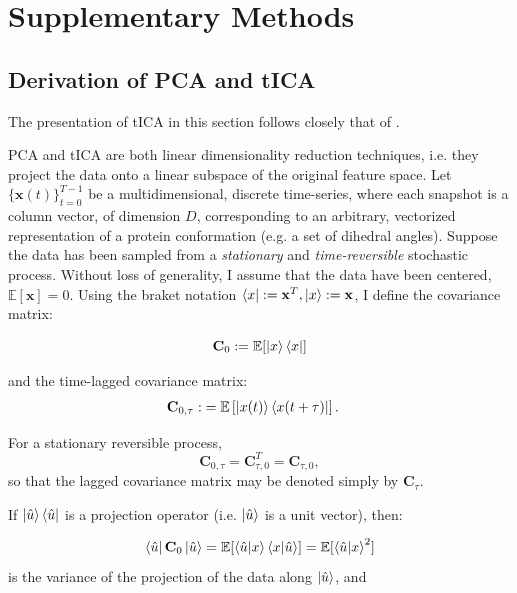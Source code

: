 \clearpage
\twocolumngrid
\section{Supplementary Methods}
\small
\renewcommand{\thesubsection}{S\arabic{subsection}}
\setcounter{subsection}{0}

\subsection{Derivation of PCA and tICA}
\label{supsec:derivation_PCA_TICA}

The presentation of tICA in this section follows closely that of \cite{my_tica_ref}.


PCA and tICA are both linear dimensionality reduction techniques, i.e. they project the data onto a linear subspace of the original feature space. 
Let $\{\mathbf{x}(t)\}_{t=0}^{T-1}$ be a multidimensional, discrete time-series, where each snapshot is a column vector, 
of dimension $D$, corresponding to an arbitrary, vectorized representation of a protein conformation (e.g. a set of dihedral angles). 
Suppose the data has been sampled from a \textit{stationary} and \textit{time-reversible} stochastic process. 
Without loss of generality, I assume that the data have been centered, $\mathbb E[\mathbf{x}] = 0 $. Using the braket notation $\bra{x} := \mathbf{x}^T, \ket{x} := \mathbf{x} $, I define the covariance matrix:


\begin{equation}
\mathbf{C}_0 := \mathbb{E}\!\left[\ket{x}\bra{x}\right]
\end{equation}

and the time-lagged covariance matrix:
\begin{align}
    \mathbf{C}_{0,\tau}:&= \mathbb{E}\left[\ket{x(t)}\bra{x(t + \tau)}\right].
\end{align}

For a stationary reversible process,
\begin{equation*}
\mathbf C_{0,\tau} = \mathbf C_{\tau,0}^{T} = \mathbf C_{\tau,0},
\end{equation*}
so that the lagged covariance matrix may be denoted simply by \(\mathbf C_\tau\).

If $\ket{\hat{u}}\bra{\hat{u}}$ is a projection operator (i.e. $\ket{\hat{u}}$ is a unit vector), then:

\begin{equation}
    \bra{\hat{u}}\mathbf{C}_0\ket{\hat{u}} = \mathbb{E}[\braket{\hat{u}|x}\braket{x|\hat{u}}] = \mathbb{E}[\braket{\hat{u}|x}^2]
\end{equation}
is the variance of the projection of the data along $\ket{\hat{u}}$, and

